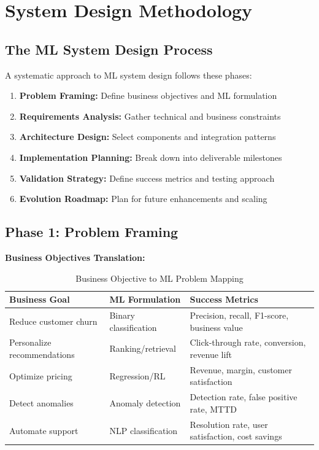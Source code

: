 \section{System Design Methodology}

\subsection{The ML System Design Process}

A systematic approach to ML system design follows these phases:

\begin{enumerate}
    \item \textbf{Problem Framing:} Define business objectives and ML formulation
    \item \textbf{Requirements Analysis:} Gather technical and business constraints
    \item \textbf{Architecture Design:} Select components and integration patterns
    \item \textbf{Implementation Planning:} Break down into deliverable milestones
    \item \textbf{Validation Strategy:} Define success metrics and testing approach
    \item \textbf{Evolution Roadmap:} Plan for future enhancements and scaling
\end{enumerate}

\subsection{Phase 1: Problem Framing}

\textbf{Business Objectives Translation:}

\begin{table}[h]
\centering
\caption{Business Objective to ML Problem Mapping}
\begin{tabular}{p{4cm}p{4cm}p{5cm}}
\toprule
\textbf{Business Goal} & \textbf{ML Formulation} & \textbf{Success Metrics} \\
\midrule
Reduce customer churn & Binary classification & Precision, recall, F1-score, business value \\
\midrule
Personalize recommendations & Ranking/retrieval & Click-through rate, conversion, revenue lift \\
\midrule
Optimize pricing & Regression/RL & Revenue, margin, customer satisfaction \\
\midrule
Detect anomalies & Anomaly detection & Detection rate, false positive rate, MTTD \\
\midrule
Automate support & NLP classification & Resolution rate, user satisfaction, cost savings \\
\bottomrule
\end{tabular}
\end{table}

